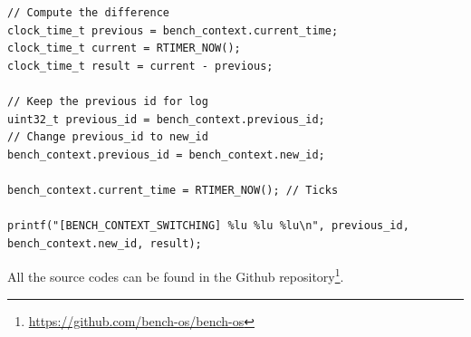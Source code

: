 \begin{lstlisting}[style=CStyle, float, label={lst:measurement-code}, caption={source code of the benchmarking framework implemented in Contiki}]
// Compute the difference
clock_time_t previous = bench_context.current_time;
clock_time_t current = RTIMER_NOW();
clock_time_t result = current - previous;

// Keep the previous id for log
uint32_t previous_id = bench_context.previous_id;
// Change previous_id to new_id
bench_context.previous_id = bench_context.new_id;

bench_context.current_time = RTIMER_NOW(); // Ticks

printf("[BENCH_CONTEXT_SWITCHING] %lu %lu %lu\n", previous_id, bench_context.new_id, result);
\end{lstlisting}

All the source codes can be found in the Github repository\footnote{\url{https://github.com/bench-os/bench-os}}.